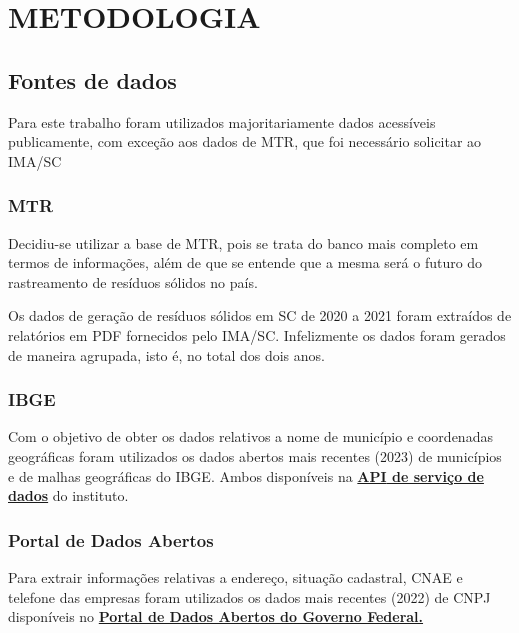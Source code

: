 \chapter{METODOLOGIA}

\section{Fontes de dados}\label{section:Fontes}

Para este trabalho foram utilizados majoritariamente dados acessíveis publicamente, com exceção aos dados de \gls{MTR}, que foi necessário solicitar ao \gls{IMA/SC}

\subsection{MTR}

Decidiu-se utilizar a base de MTR, pois se trata do banco mais completo em termos de informações, além de que se entende que a mesma será o futuro do rastreamento de resíduos sólidos no país.

Os dados de geração de resíduos sólidos em \gls{SC} de 2020 a 2021 foram extraídos de relatórios em \gls{PDF} fornecidos pelo \gls{IMA/SC}. Infelizmente os dados foram gerados de maneira agrupada, isto é, no total dos dois anos.

\subsection{IBGE}

Com o objetivo de obter os dados relativos a nome de município e coordenadas geográficas foram utilizados os dados abertos mais recentes (2023) de municípios e de malhas geográficas do \gls{IBGE}. Ambos disponíveis na \href{https://servicodados.ibge.gov.br/api/docs/}{\textbf{\gls{API} de serviço de dados}} do instituto.

\subsection{Portal de Dados Abertos}

Para extrair informações relativas a endereço, situação cadastral, \gls{CNAE} e telefone das empresas foram utilizados os dados mais recentes (2022) de \gls{CNPJ} disponíveis no \href{https://dados.gov.br/dados/conjuntos-dados/cadastro-nacional-da-pessoa-juridica---cnpj}{\textbf{Portal de Dados Abertos do Governo Federal.}}

